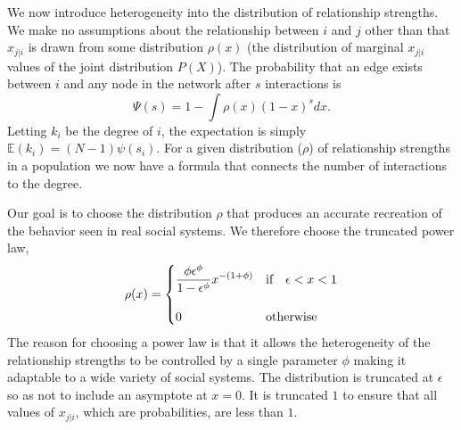 \documentclass[twocolumn,8pt]{article}
\begin{document}
We now introduce heterogeneity into the distribution of relationship strengths. We make no assumptions about the relationship between $i$ and $j$ other than that $x_{j|i}$ is drawn from some distribution $\rho(x)$ (the distribution of marginal $x_{j|i}$ values of the joint distribution $P(X)$). The probability that an edge exists between $i$ and any node in the network after $s$ interactions is
\begin{equation}
\label{i_to_any_sup}
\Psi(s)=1-\int\rho(x)(1-x)^{s}dx.
\end{equation}
Letting $k_{i}$ be the degree of $i$, the expectation is simply $\mathbb{E}(k_{i})=(N-1)\psi(s_{i})$. For a given distribution ($\rho$) of relationship strengths in a population we now have a formula that connects the number of interactions to the degree.

Our goal is to choose the distribution $\rho$ that produces an accurate recreation of the behavior seen in real social systems. We therefore choose the truncated power law,
\begin{equation}
\label{distribution_sup}
\rho(x)=\begin{dcases}
		\frac{\phi\epsilon^{\phi}}{1-\epsilon^{\phi}}x^{-(1+\phi)}&\text{if}\quad\epsilon<x<1\\[10pt]
        0 & \text{otherwise}
        \end{dcases}
\end{equation}
The reason for choosing a power law is that it allows the heterogeneity of the relationship strengths to be controlled by a single parameter $\phi$ making it adaptable to a wide variety of social systems. The distribution is truncated at $\epsilon$ so as not to include an asymptote at $x=0$. It is truncated $1$ to ensure that all values of $x_{j|i}$, which are probabilities, are less than $1$.
\end{document}
